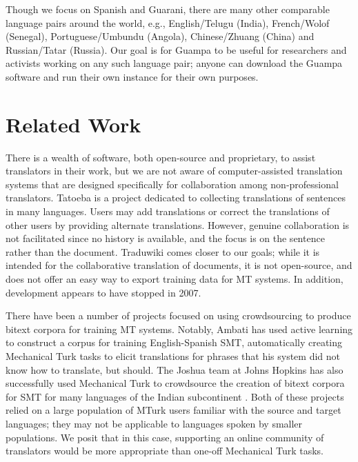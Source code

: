\documentclass[10pt, a4paper]{article}
\begin{document}
Though we focus on Spanish and Guarani, there are many other comparable
language pairs around the world, e.g., English/Telugu (India), French/Wolof
(Senegal), Portuguese/Umbundu (Angola), Chinese/Zhuang (China) and
Russian/Tatar (Russia). Our goal is for Guampa to be useful for researchers and
activists working on any such language pair; anyone can download the Guampa
software and run their own instance for their own purposes.

\section{Related Work}
There is a wealth of software, both open-source and proprietary, to assist
translators in their work, but we are not aware of computer-assisted
translation systems that are designed specifically for collaboration among
non-professional translators. Tatoeba \cite{tatoeba} is a
project dedicated to collecting translations of sentences in many languages.
Users may add translations or correct the translations of other users by
providing alternate translations. However, genuine collaboration is not
facilitated since no history is available, and the focus is on the sentence
rather than the document. Traduwiki \cite{traduwiki} comes closer
to our goals; while it is intended for the collaborative translation of
documents, it is not open-source, and does not offer an easy way to export
training data for MT systems. In addition, development appears
to have stopped in 2007.

There have been a number of projects focused on using crowdsourcing to produce
bitext corpora for training MT systems. Notably, Ambati
\cite{ambati_naacl,ambati_act} has used active learning to construct a corpus
for training English-Spanish SMT, automatically creating Mechanical Turk tasks
to elicit translations for phrases that his system did not know how to
translate, but should. The Joshua team at Johns Hopkins has also successfully
used Mechanical Turk to crowdsource the creation of bitext corpora for SMT for
many languages of the Indian subcontinent
\cite{post-callisonburch-osborne:2012:WMT}. Both of these projects relied on a
large population of MTurk users familiar with the source and target languages;
they may not be applicable to languages spoken by smaller populations. We posit
that in this case, supporting an online community of translators would be more
appropriate than one-off Mechanical Turk tasks.
\end{document}
